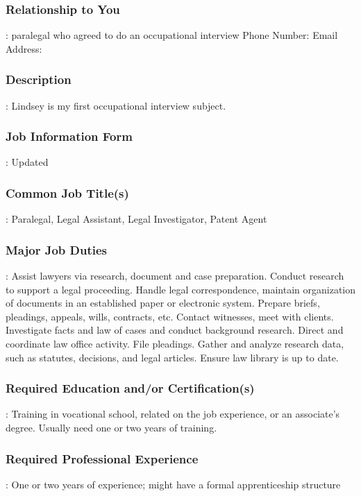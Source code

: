 \subsubsection*{Relationship to You}: paralegal who agreed to do an occupational interview Phone Number: Email Address:

\subsubsection*{Description}: Lindsey is my first occupational interview subject.

\subsubsection*{Job Information Form}: Updated

\subsubsection*{Common Job Title(s)}: Paralegal, Legal Assistant, Legal Investigator, Patent Agent

\subsubsection*{Major Job Duties}: Assist lawyers via research, document and case preparation. Conduct research to support a legal proceeding. Handle legal correspondence, maintain organization of documents in an established paper or electronic system. Prepare briefs, pleadings, appeals, wills, contracts, etc. Contact witnesses, meet with clients. Investigate facts and law of cases and conduct background research. Direct and coordinate law office activity. File pleadings. Gather and analyze research data, such as statutes, decisions, and legal articles. Ensure law library is up to date.

\subsubsection*{Required Education and/or Certification(s)}: Training in vocational school, related on the job experience, or an associate's degree. Usually need one or two years of training.

\subsubsection*{Required Professional Experience}: One or two years of experience; might have a formal apprenticeship structure

